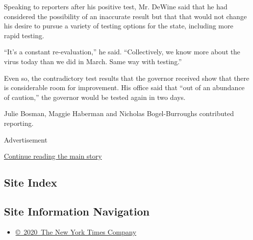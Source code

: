 Speaking to reporters after his positive test, Mr. DeWine said that he
had considered the possibility of an inaccurate result but that that
would not change his desire to pursue a variety of testing options for
the state, including more rapid testing.

``It's a constant re-evaluation,'' he said. ``Collectively, we know more
about the virus today than we did in March. Same way with testing.''

Even so, the contradictory test results that the governor received show
that there is considerable room for improvement. His office said that
``out of an abundance of caution,'' the governor would be tested again
in two days.

Julie Bosman, Maggie Haberman and Nicholas Bogel-Burroughs contributed
reporting.

Advertisement

\protect\hyperlink{after-bottom}{Continue reading the main story}

\hypertarget{site-index}{%
\subsection{Site Index}\label{site-index}}

\hypertarget{site-information-navigation}{%
\subsection{Site Information
Navigation}\label{site-information-navigation}}

\begin{itemize}
\tightlist
\item
  \href{https://help.nytimes3xbfgragh.onion/hc/en-us/articles/115014792127-Copyright-notice}{©~2020~The
  New York Times Company}
\end{itemize}

